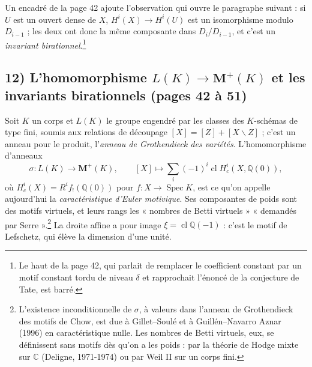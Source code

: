 \documentclass[11pt,a4paper]{article}
\begin{document}
Un encadré de la page 42 ajoute l'observation qui ouvre le paragraphe suivant :
si $U$ est un ouvert dense de $X$, $H^{i}(X) \to H^{i}(U)$ est un isomorphisme
modulo $D_{i-1}$ ; les deux ont donc la même composante dans $D_{i}/D_{i-1}$, et
c'est un \emph{invariant birationnel}.\footnote{Le haut de la page 42, qui
parlait de remplacer le coefficient constant par un motif constant tordu de
niveau $\delta$ et rapprochait l'énoncé de la conjecture de Tate, est barré.}

\subsection*{12) L'homomorphisme $L(K) \to \mathbf{M}^{+}(K)$ et les invariants birationnels (pages 42 à 51)}

Soit $K$ un corps et $L(K)$ le groupe engendré par les classes des $K$-schémas
de type fini, soumis aux relations de découpage $[X] = [Z] + [X \smallsetminus
Z]$ ; c'est un anneau pour le produit, l'\emph{anneau de Grothendieck des
variétés}. L'homomorphisme d'anneaux
\[
\sigma \colon L(K) \longrightarrow \mathbf{M}^{+}(K) ,
\qquad
[X] \longmapsto \sum_{i} (-1)^{i}\operatorname{cl} H^{i}_{c}(X, \mathbb{Q}(0)) ,
\]
où $H^{i}_{c}(X) = R^{i}f_{!}(\mathbb{Q}(0))$ pour $f \colon X \to
\operatorname{Spec} K$, est ce qu'on appelle aujourd'hui la
\emph{caractéristique d'Euler motivique}. Ses composantes de poids sont des motifs
virtuels, et leurs rangs les « nombres de Betti virtuels » « demandés par
Serre ».\footnote{L'existence inconditionnelle de $\sigma$, à valeurs dans
l'anneau de Grothendieck des motifs de Chow, est due à Gillet--Soulé et à
Guillén--Navarro Aznar (1996) en caractéristique nulle. Les nombres de Betti
virtuels, eux, se définissent sans motifs dès qu'on a les poids : par la théorie
de Hodge mixte sur $\mathbb{C}$ (Deligne, 1971-1974) ou par Weil II sur un corps
fini.} La droite affine a pour image $\xi = \operatorname{cl}\mathbb{Q}(-1)$ :
c'est le motif de Lefschetz, qui élève la dimension d'une unité.
\end{document}
